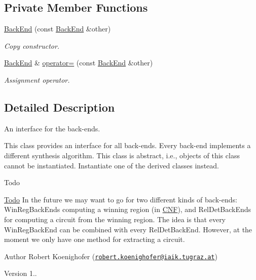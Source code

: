 \subsection*{Private Member Functions}
\begin{DoxyCompactItemize}
\item 
\hyperlink{classBackEnd_a157822fdd45ad2cab86251e44ec6ad6b}{Back\-End} (const \hyperlink{classBackEnd}{Back\-End} \&other)
\begin{DoxyCompactList}\small\item\em Copy constructor. \end{DoxyCompactList}\item 
\hyperlink{classBackEnd}{Back\-End} \& \hyperlink{classBackEnd_a950f2ef881720fa8ffb90f7da23ab414}{operator=} (const \hyperlink{classBackEnd}{Back\-End} \&other)
\begin{DoxyCompactList}\small\item\em Assignment operator. \end{DoxyCompactList}\end{DoxyCompactItemize}


\subsection{Detailed Description}
An interface for the back-\/ends. 

This class provides an interface for all back-\/ends. Every back-\/end implements a different synthesis algorithm. This class is abstract, i.\-e., objects of this class cannot be instantiated. Instantiate one of the derived classes instead.

\begin{DoxyRefDesc}{Todo}
\item[\hyperlink{todo__todo000001}{Todo}]In the future we may want to go for two different kinds of back-\/ends\-: Win\-Reg\-Back\-Ends computing a winning region (in \hyperlink{classCNF}{C\-N\-F}), and Rel\-Det\-Back\-Ends for computing a circuit from the winning region. The idea is that every Win\-Reg\-Back\-End can be combined with every Rel\-Det\-Back\-End. However, at the moment we only have one method for extracting a circuit. \end{DoxyRefDesc}
\begin{DoxyAuthor}{Author}
Robert Koenighofer (\href{mailto:robert.koenighofer@iaik.tugraz.at}{\tt robert.\-koenighofer@iaik.\-tugraz.\-at}) 
\end{DoxyAuthor}
\begin{DoxyVersion}{Version}
1.. 
\end{DoxyVersion}


